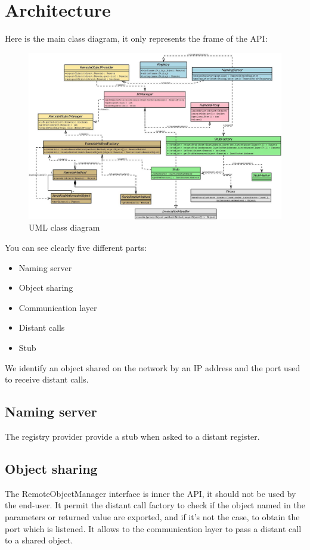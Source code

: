 \chapter{Architecture}

Here is the main class diagram, it only represents the frame of the API:
\begin{figure}[H]
\begin{center}
\includegraphics[scale=0.42,angle=90]{../img/diag_classes.jpeg}
\caption{UML class diagram}
\end{center}
\end{figure}
\medskip
\hspace{-.6cm}You can see clearly five different parts:
\begin{itemize}
\item Naming server
\item Object sharing
\item Communication layer
\item Distant calls
\item Stub
\end{itemize}
\medskip
We identify an object shared on the network by an IP address and the port used to receive distant calls.

\section{Naming server}
The registry provider provide a stub when asked to a distant register.

\section{Object sharing}
The RemoteObjectManager interface is inner the API, it should not be used by the end-user. It permit the distant call factory to check if the object named in the parameters or returned value are exported, and if it's not the case, to obtain the port which is listened. It allows to the communication layer to pass a distant call to a shared object.

